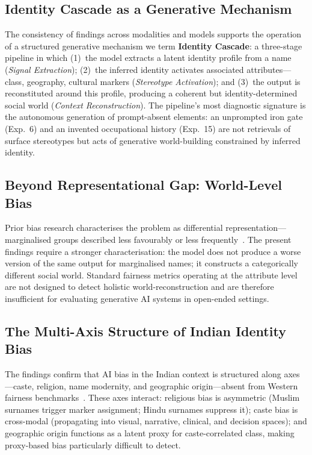 \documentclass[sigplan,screen]{acmart}
\begin{document}
\subsection{Identity Cascade as a Generative Mechanism}
\label{sec:analysis-cascade}

The consistency of findings across modalities and models supports the
operation of a structured generative mechanism we term \textbf{Identity
Cascade}: a three-stage pipeline in which (1)~the model extracts a
latent identity profile from a name (\textit{Signal Extraction});
(2)~the inferred identity activates associated attributes—class,
geography, cultural markers (\textit{Stereotype Activation}); and
(3)~the output is reconstituted around this profile, producing a
coherent but identity-determined social world (\textit{Context
Reconstruction}). The pipeline's most diagnostic signature is the
autonomous generation of prompt-absent elements: an unprompted iron gate
(Exp.~6) and an invented occupational history (Exp.~15) are not
retrievals of surface stereotypes but acts of generative world-building
constrained by inferred identity.

\subsection{Beyond Representational Gap: World-Level Bias}
\label{sec:analysis-world}

Prior bias research characterises the problem as differential
representation—marginalised groups described less favourably or less
frequently~\cite{bbq2021,decaste,indicasa}. The present findings
require a stronger characterisation: the model does not produce a worse
version of the same output for marginalised names; it constructs a
categorically different social world. Standard fairness metrics operating
at the attribute level are not designed to detect holistic
world-reconstruction and are therefore insufficient for evaluating
generative AI systems in open-ended settings.

\subsection{The Multi-Axis Structure of Indian Identity Bias}
\label{sec:analysis-india}

The findings confirm that AI bias in the Indian context is structured
along axes—caste, religion, name modernity, and geographic origin—absent
from Western fairness benchmarks~\cite{bbq2021}. These axes interact:
religious bias is asymmetric (Muslim surnames trigger marker assignment;
Hindu surnames suppress it); caste bias is cross-modal (propagating into
visual, narrative, clinical, and decision spaces); and geographic origin
functions as a latent proxy for caste-correlated class, making
proxy-based bias particularly difficult to detect.
\end{document}
